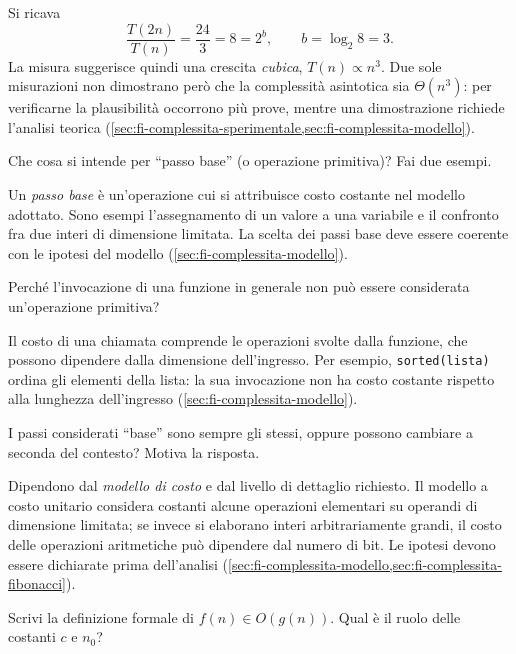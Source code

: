 Si ricava
\[
  \frac{T(2n)}{T(n)}=\frac{24}{3}=8=2^b,
  \qquad b=\log_2 8=3.
\]
La misura suggerisce quindi una crescita \emph{cubica},
\(T(n)\propto n^3\). Due sole misurazioni non dimostrano però
che la complessità asintotica sia \(\Theta(n^3)\): per verificarne
la plausibilità occorrono più prove, mentre una dimostrazione
richiede l'analisi teorica
(\cref{sec:fi-complessita-sperimentale,sec:fi-complessita-modello}).

\begin{exercise}
\label{ex:fi-esercizi-complessita-passo-base}
Che cosa si intende per ``passo base'' (o operazione primitiva)?
Fai due esempi.
\end{exercise}

Un \emph{passo base} è un'operazione cui si attribuisce costo
costante nel modello adottato. Sono esempi l'assegnamento
di un valore a una variabile e il confronto fra due interi
di dimensione limitata. La scelta dei passi base deve essere
coerente con le ipotesi del modello
(\cref{sec:fi-complessita-modello}).

\begin{exercise}
\label{ex:fi-esercizi-complessita-chiamata-funzione}
Perché l'invocazione di una funzione in generale non può essere
considerata un'operazione primitiva?
\end{exercise}

Il costo di una chiamata comprende le operazioni svolte dalla
funzione, che possono dipendere dalla dimensione dell'ingresso.
Per esempio, \texttt{sorted(lista)} ordina gli elementi della lista:
la sua invocazione non ha costo costante rispetto alla lunghezza
dell'ingresso (\cref{sec:fi-complessita-modello}).

\begin{exercise}
\label{ex:fi-esercizi-complessita-passi-contesto}
I passi considerati ``base'' sono sempre gli stessi, oppure
possono cambiare a seconda del contesto? Motiva la risposta.
\end{exercise}

Dipendono dal \emph{modello di costo} e dal livello di dettaglio
richiesto. Il modello a costo unitario considera costanti alcune
operazioni elementari su operandi di dimensione limitata; se
invece si elaborano interi arbitrariamente grandi, il costo
delle operazioni aritmetiche può dipendere dal numero di bit.
Le ipotesi devono essere dichiarate prima dell'analisi
(\cref{sec:fi-complessita-modello,sec:fi-complessita-fibonacci}).

\begin{exercise}
\label{ex:fi-esercizi-complessita-definizione-o}
Scrivi la definizione formale di \(f(n)\in O(g(n))\).
Qual è il ruolo delle costanti \(c\) e \(n_0\)?
\end{exercise}

